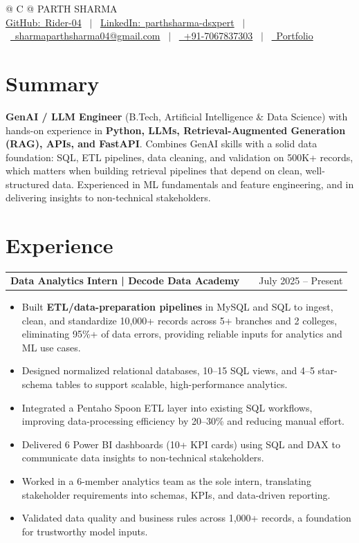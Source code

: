 \documentclass[a4paper,10pt]{article}
\makeatletter
\newcommand{\faGithub}{GitHub:}\newcommand{\faLinkedin}{LinkedIn:}\newcommand{\faEnvelope}{}%
\newcommand{\faMobile}{}\newcommand{\faGlobe}{}}
\newenvironment{joblong}[2]
    {
    \begin{tabularx}{\linewidth}{@{}l X r@{}}
    \textbf{#1} & \hfill &  #2 \\[2pt]
    \end{tabularx}
    \begin{minipage}[t]{\linewidth}
    \begin{itemize}[nosep,after=\strut, leftmargin=1em, itemsep=1pt,label=--]
    }
    {
    \end{itemize}
    \end{minipage}
    }
\makeatother
\begin{document}
\pagestyle{empty}

\begin{tabularx}{\linewidth}{@{} C @{}}
\Huge{PARTH SHARMA} \\[5pt]
\href{https://github.com/Rider-04}{\raisebox{-0.05\height}\faGithub\ Rider-04} \ $|$ \
\href{https://www.linkedin.com/in/parthsharma-dsxpert}{\raisebox{-0.05\height}\faLinkedin\ parthsharma-dsxpert} \ $|$ \
\href{mailto:sharmaparthsharma04@gmail.com}{\raisebox{-0.05\height}\faEnvelope \ sharmaparthsharma04@gmail.com} \ $|$ \
\href{tel:+917067837303}{\raisebox{-0.05\height}\faMobile \ +91-7067837303} \ $|$ \
\href{https://parth-portfolio-virid.vercel.app/}{\raisebox{-0.05\height}\faGlobe \ Portfolio}
\end{tabularx}

\section{Summary}
\textbf{GenAI / LLM Engineer} (B.Tech, Artificial Intelligence \& Data Science) with hands-on experience in \textbf{Python, LLMs, Retrieval-Augmented Generation (RAG), APIs, and FastAPI}. Combines GenAI skills with a solid data foundation: SQL, ETL pipelines, data cleaning, and validation on 500K+ records, which matters when building retrieval pipelines that depend on clean, well-structured data. Experienced in ML fundamentals and feature engineering, and in delivering insights to non-technical stakeholders.

\section{Experience}
\begin{joblong}{Data Analytics Intern | Decode Data Academy}{July 2025 -- Present}
\item Built \textbf{ETL/data-preparation pipelines} in MySQL and SQL to ingest, clean, and standardize 10,000+ records across 5+ branches and 2 colleges, eliminating 95\%+ of data errors, providing reliable inputs for analytics and ML use cases.
\item Designed normalized relational databases, 10--15 SQL views, and 4--5 star-schema tables to support scalable, high-performance analytics.
\item Integrated a Pentaho Spoon ETL layer into existing SQL workflows, improving data-processing efficiency by 20--30\% and reducing manual effort.
\item Delivered 6 Power BI dashboards (10+ KPI cards) using SQL and DAX to communicate data insights to non-technical stakeholders.
\item Worked in a 6-member analytics team as the sole intern, translating stakeholder requirements into schemas, KPIs, and data-driven reporting.
\item Validated data quality and business rules across 1,000+ records, a foundation for trustworthy model inputs.
\end{joblong}
\end{document}
